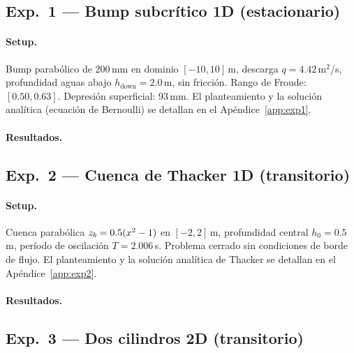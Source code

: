 \subsection{Exp.\ 1 --- Bump subcrítico 1D (estacionario)}
\label{sec:exp1}

\paragraph{Setup.}
Bump parabólico de 200\,mm en dominio $[-10, 10]$\,m, descarga
$q = 4.42$\,m$^2$/s, profundidad aguas abajo $h_{\text{down}} = 2.0$\,m,
sin fricción. Rango de Froude: $[0.50, 0.63]$. Depresión superficial:
93\,mm. El planteamiento y la solución analítica (ecuación de Bernoulli) se
detallan en el Apéndice~\ref{app:exp1}.

\paragraph{Resultados.}

\subsection{Exp.\ 2 --- Cuenca de Thacker 1D (transitorio)}
\label{sec:exp2}

\paragraph{Setup.}
Cuenca parabólica $z_b = 0.5(x^2 - 1)$ en $[-2, 2]$\,m, profundidad
central $h_0 = 0.5$\,m, período de oscilación $T = 2.006$\,s.
Problema cerrado sin condiciones de borde de flujo. El planteamiento y la
solución analítica de Thacker se detallan en el Apéndice~\ref{app:exp2}.

\paragraph{Resultados.}

\subsection{Exp.\ 3 --- Dos cilindros 2D (transitorio)}
\label{sec:exp3}

